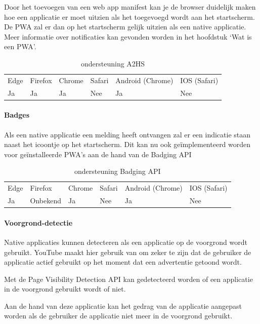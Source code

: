  Door het toevoegen van een web app manifest kan je de browser duidelijk maken hoe een applicatie er moet uitzien als het toegevoegd wordt aan het startscherm. De PWA zal er dan op het startscherm gelijk uitzien als een native applicatie.
Meer informatie over notificaties kan gevonden worden in het hoofdstuk ‘Wat is een PWA’.


\begin{table}[H]
	\centering
	\begin{tabular}{llllll}
		Edge & Firefox & Chrome & Safari & Android (Chrome) & IOS (Safari) \\
		Ja   & Ja      &  Ja     & Nee     & Ja               & Nee          
	\end{tabular}	
	\caption{ondersteuning A2HS }
\end{table}


\paragraph{Badges}

Als een native applicatie een melding heeft ontvangen zal er een indicatie staan naast het icoontje op het startscherm. Dit kan nu ook geïmplementeerd worden voor geïnstalleerde PWA’s aan de hand van de Badging API \autocite{LePage2020a}

\begin{table}[H]
	\centering
	\begin{tabular}{llllll}
		Edge & Firefox & Chrome & Safari & Android (Chrome) & IOS (Safari) \\
		Ja   & Onbekend      &  Ja     & Nee     & Ja               & Nee          
	\end{tabular}	
	\caption{ondersteuning Badging API }
\end{table}

\paragraph{Voorgrond-detectie }

Native applicaties kunnen detecteren als een applicatie op de voorgrond wordt gebruikt. YouTube maakt hier gebruik van om zeker te zijn dat de gebruiker de applicatie actief gebruikt op het moment dat een advertentie getoond wordt.

Met de Page Visibility Detection API \autocite{Grigorik2020} kan gedetecteerd worden of een applicatie in de voorgrond gebruikt wordt of niet. 

Aan de hand van deze applicatie kan het gedrag van de applicatie aangepast worden als de gebruiker de applicatie niet meer in de voorgrond gebruikt.

